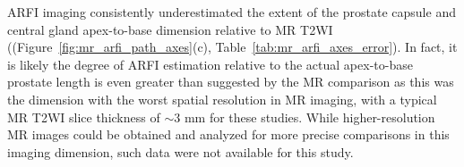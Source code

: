 ARFI imaging consistently underestimated the extent of the prostate capsule and
central gland apex-to-base dimension relative to MR T2WI
((Figure~\ref{fig:mr_arfi_path_axes}(c), Table~\ref{tab:mr_arfi_axes_error}).
In fact, it is likely the degree of ARFI estimation relative to the actual
apex-to-base prostate length is even greater than suggested by the MR
comparison as this was the dimension with the worst spatial resolution in MR
imaging, with a typical MR T2WI slice thickness of $\sim$3 mm for these
studies.  While higher-resolution MR images could be obtained and analyzed for
more precise comparisons in this imaging dimension, such data were not available
for this study. 
